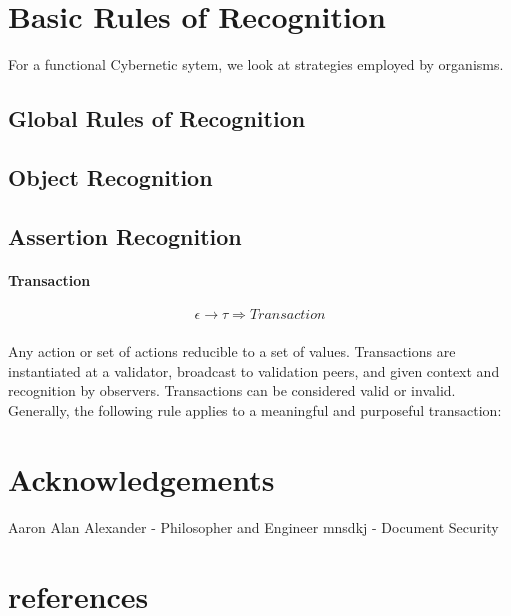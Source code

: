 \documentclass{article}
\begin{document}
	
\section{Basic Rules of Recognition}
For a functional Cybernetic sytem, we look at strategies employed by organisms.

\subsection{Global Rules of Recognition}

\subsection{Object Recognition}

\subsection{Assertion Recognition}
	
		\paragraph{Transaction}
		\begin{equation}
		\epsilon \rightarrow \tau \Rightarrow Transaction
		\end{equation}
		\subparagraph{}
			Any action or set of actions reducible to a set of values.  Transactions are instantiated at a validator, broadcast to validation peers, and given context and recognition by observers.  Transactions can be considered valid or invalid. Generally, the following rule applies to a meaningful and purposeful transaction:

\section{Acknowledgements}
Aaron Alan Alexander - Philosopher and Engineer
mnsdkj - Document Security

\section{references}




\newpage
	
\end{document}
